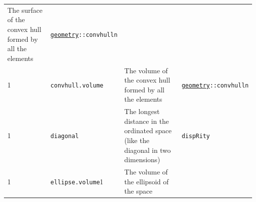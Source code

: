 \documentclass[]{book}
\theoremstyle{definition}
\theoremstyle{definition}
\theoremstyle{remark}
\begin{document}
\begin{longtable}[]{@{}llll@{}}
\begin{minipage}[t]{0.61\columnwidth}
The surface of the convex hull formed by all the elements\strut
\end{minipage} & \begin{minipage}[t]{0.11\columnwidth}\raggedright\strut
\href{https://cran.r-project.org/web/packages/geometry/index.html}{\texttt{geometry}}\texttt{::convhulln}\strut
\end{minipage}\tabularnewline
\begin{minipage}[t]{0.08\columnwidth}\raggedright\strut
1\strut
\end{minipage} & \begin{minipage}[t]{0.08\columnwidth}\raggedright\strut
\texttt{convhull.volume}\strut
\end{minipage} & \begin{minipage}[t]{0.61\columnwidth}\raggedright\strut
The volume of the convex hull formed by all the elements\strut
\end{minipage} & \begin{minipage}[t]{0.11\columnwidth}\raggedright\strut
\href{https://cran.r-project.org/web/packages/geometry/index.html}{\texttt{geometry}}\texttt{::convhulln}\strut
\end{minipage}\tabularnewline
\begin{minipage}[t]{0.08\columnwidth}\raggedright\strut
1\strut
\end{minipage} & \begin{minipage}[t]{0.08\columnwidth}\raggedright\strut
\texttt{diagonal}\strut
\end{minipage} & \begin{minipage}[t]{0.61\columnwidth}\raggedright\strut
The longest distance in the ordinated space (like the diagonal in two
dimensions)\strut
\end{minipage} & \begin{minipage}[t]{0.11\columnwidth}\raggedright\strut
\texttt{dispRity}\strut
\end{minipage}\tabularnewline
\begin{minipage}[t]{0.08\columnwidth}\raggedright\strut
1\strut
\end{minipage} & \begin{minipage}[t]{0.08\columnwidth}\raggedright\strut
\texttt{ellipse.volume}1\strut
\end{minipage} & \begin{minipage}[t]{0.61\columnwidth}\raggedright\strut
The volume of the ellipsoid of the space\strut
\end{minipage} & \begin{minipage}[t]{0.11\columnwidth}\raggedright\strut

\end{minipage}
\end{longtable}
\end{document}
